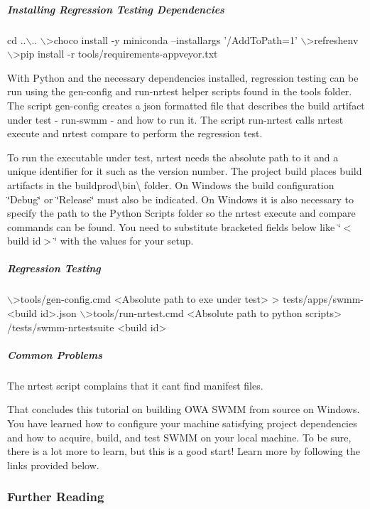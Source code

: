 \subparagraph*{Installing Regression Testing Dependencies}


\begin{DoxyCode}
cd ..\(\backslash\)..
\(\backslash\)>choco install -y miniconda --installargs '/AddToPath=1'
\(\backslash\)>refreshenv
\(\backslash\)>pip install -r tools/requirements-appveyor.txt
\end{DoxyCode}


With Python and the necessary dependencies installed, regression testing can be run using the gen-\/config and run-\/nrtest helper scripts found in the tools folder. The script gen-\/config creates a json formatted file that describes the build artifact under test -\/ run-\/swmm -\/ and how to run it. The script run-\/nrtest calls nrtest execute and nrtest compare to perform the regression test.

To run the executable under test, nrtest needs the absolute path to it and a unique identifier for it such as the version number. The project build places build artifacts in the {\ttfamily buildprod\textbackslash{}bin\textbackslash{}} folder. On Windows the build configuration \char`\"{}\+Debug\char`\"{} or \char`\"{}\+Release\char`\"{} must also be indicated. On Windows it is also necessary to specify the path to the Python Scripts folder so the nrtest execute and compare commands can be found. You need to substitute bracketed fields below like \char`\"{}$<$build id$>$\char`\"{} with the values for your setup.

\subparagraph*{Regression Testing}


\begin{DoxyCode}
\(\backslash\)>tools/gen-config.cmd <Absolute path to exe under test> > tests/apps/swmm-<build id>.json
\(\backslash\)>tools/run-nrtest.cmd <Absolute path to python scripts> /tests/swmm-nrtestsuite <build id>
\end{DoxyCode}


\subparagraph*{Common Problems}

The nrtest script complains that it can\textquotesingle{}t find manifest files.

That concludes this tutorial on building O\+WA S\+W\+MM from source on Windows. You have learned how to configure your machine satisfying project dependencies and how to acquire, build, and test S\+W\+MM on your local machine. To be sure, there is a lot more to learn, but this is a good start! Learn more by following the links provided below.

\subsubsection*{Further Reading}

